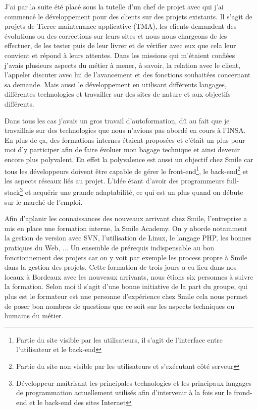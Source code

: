 \documentclass[a4paper,11pt,twoside]{report}
\begin{document}
  J'ai par la suite été placé sous la tutelle d'un chef de projet avec qui j'ai commencé le développement pour des clients sur des projets existants. Il s'agit de projets de Tierce maintenance applicative (TMA), les clients demandent des évolutions ou des corrections sur leurs sites et nous nous chargeons de les effectuer, de les tester puis de leur livrer et de vérifier avec eux que cela leur convient et répond à leurs attentes. Dans les missions qui m'étaient confiées j'avais plusieurs aspects du métier à mener, à savoir, la relation avec le client, l'appeler discuter avec lui de l'avancement et des fonctions souhaitées concernant sa demande. Mais aussi le développement en utilisant différents langages, différentes technologies et travailler sur des sites de nature et aux objectifs différents.\newline 
  
  Dans tous les cas j'avais un gros travail d'autoformation, dû au fait que je travaillais sur des technologies que nous n'avions pas abordé en cours à l'INSA. En plus de ça, des formations internes étaient proposées et c'était un plus pour moi d'y participer afin de faire évoluer mon bagage technique et ainsi devenir encore plus polyvalent. En effet la polyvalence est aussi un objectif chez Smile car tous les développeurs doivent être capable de gérer le front-end\footnote{Partie du site visible par les utilisateurs, il s'agit de l'interface entre l'utilisateur et le back-end}, le back-end\footnote{Partie du site non visible par les utilisateurs et s'exécutant côté serveur} et les aspects réseaux liés au projet. L'idée étant d'avoir des programmeurs full-stack\footnote{Développeur maîtrisant les principales technologies et les principaux langages de programmation actuellement utilisés afin d'intervenir à la fois sur le frond-end et le back-end des sites Internet} et acquérir une grande adaptabilité, ce qui est un plus quand on débute sur le marché de l'emploi.\newline
  
  Afin d'aplanir les connaissances des nouveaux arrivant chez Smile, l'entreprise a mis en place une formation interne, la Smile Academy. On y aborde notamment la gestion de version avec SVN, l'utilisation de Linux, le langage PHP, les bonnes pratiques du Web, ... Un ensemble de prérequis indispensable au bon fonctionnement des projets car on y voit par exemple les process propre à Smile dans la gestion des projets. Cette formation de trois jours a eu lieu dans nos locaux à Bordeaux avec les nouveaux arrivants, nous étions six personnes à suivre la formation. Selon moi il s'agit d'une bonne initiative de la part du groupe, qui plus est le formateur est une personne d'expérience chez Smile cela nous permet de poser bon nombres de questions que ce soit sur les aspects techniques ou humains du métier.\newline
  
\end{document}
